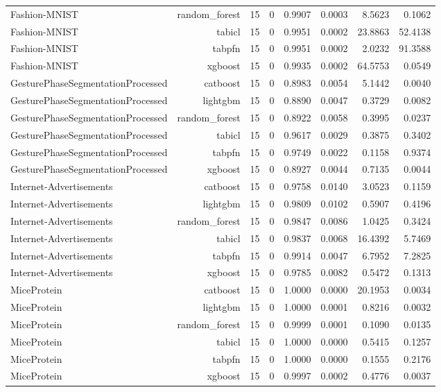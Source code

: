 \begin{table}[htbp]
\begin{tabular}{lrrrrrrr}
Fashion-MNIST & random\_forest & 15 & 0 & 0.9907 & 0.0003 & 8.5623 & 0.1062 \\
Fashion-MNIST & tabicl & 15 & 0 & 0.9951 & 0.0002 & 23.8863 & 52.4138 \\
Fashion-MNIST & tabpfn & 15 & 0 & 0.9951 & 0.0002 & 2.0232 & 91.3588 \\
Fashion-MNIST & xgboost & 15 & 0 & 0.9935 & 0.0002 & 64.5753 & 0.0549 \\
GesturePhaseSegmentationProcessed & catboost & 15 & 0 & 0.8983 & 0.0054 & 5.1442 & 0.0040 \\
GesturePhaseSegmentationProcessed & lightgbm & 15 & 0 & 0.8890 & 0.0047 & 0.3729 & 0.0082 \\
GesturePhaseSegmentationProcessed & random\_forest & 15 & 0 & 0.8922 & 0.0058 & 0.3995 & 0.0237 \\
GesturePhaseSegmentationProcessed & tabicl & 15 & 0 & 0.9617 & 0.0029 & 0.3875 & 0.3402 \\
GesturePhaseSegmentationProcessed & tabpfn & 15 & 0 & 0.9749 & 0.0022 & 0.1158 & 0.9374 \\
GesturePhaseSegmentationProcessed & xgboost & 15 & 0 & 0.8927 & 0.0044 & 0.7135 & 0.0044 \\
Internet-Advertisements & catboost & 15 & 0 & 0.9758 & 0.0140 & 3.0523 & 0.1159 \\
Internet-Advertisements & lightgbm & 15 & 0 & 0.9809 & 0.0102 & 0.5907 & 0.4196 \\
Internet-Advertisements & random\_forest & 15 & 0 & 0.9847 & 0.0086 & 1.0425 & 0.3424 \\
Internet-Advertisements & tabicl & 15 & 0 & 0.9837 & 0.0068 & 16.4392 & 5.7469 \\
Internet-Advertisements & tabpfn & 15 & 0 & 0.9914 & 0.0047 & 6.7952 & 7.2825 \\
Internet-Advertisements & xgboost & 15 & 0 & 0.9785 & 0.0082 & 0.5472 & 0.1313 \\
MiceProtein & catboost & 15 & 0 & 1.0000 & 0.0000 & 20.1953 & 0.0034 \\
MiceProtein & lightgbm & 15 & 0 & 1.0000 & 0.0001 & 0.8216 & 0.0032 \\
MiceProtein & random\_forest & 15 & 0 & 0.9999 & 0.0001 & 0.1090 & 0.0135 \\
MiceProtein & tabicl & 15 & 0 & 1.0000 & 0.0000 & 0.5415 & 0.1257 \\
MiceProtein & tabpfn & 15 & 0 & 1.0000 & 0.0000 & 0.1555 & 0.2176 \\
MiceProtein & xgboost & 15 & 0 & 0.9997 & 0.0002 & 0.4776 & 0.0037 \\

\end{tabular}
\end{table}
